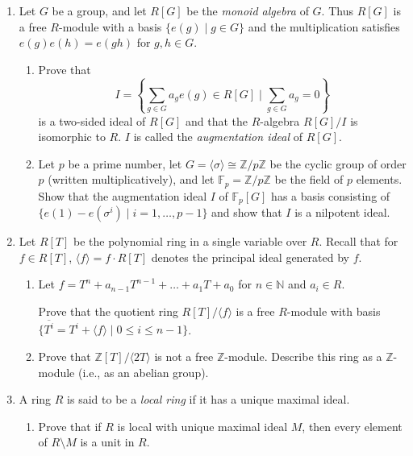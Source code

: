 \documentclass{article}
\begin{document}
\begin{enumerate}
\item
Let $ G $ be a group, and let $ R[G] $ be the \emph{monoid algebra} of $ G $. Thus $ R[G] $ is a free $ R $-module with a basis $ \{e(g) \mid g \in G\} $ and the multiplication satisfies $ e(g) e(h) = e(gh) $ for $ g, h \in G $.

\begin{enumerate}
    \item Prove that 
    $$I = \left\{\sum_{g \in G} a_g e(g) \in R[G] \; \bigg| \; \sum_{g \in G} a_g = 0 \right\}$$
    is a two-sided ideal of $ R[G] $ and that the $ R $-algebra $ R[G] / I $ is isomorphic to $ R $. $ I $ is called the \emph{augmentation ideal} of $ R[G] $.

    \item Let $ p $ be a prime number, let $ G = \langle \sigma \rangle \cong \mathbb{Z}/p\mathbb{Z} $ be the cyclic group of order $ p $ (written multiplicatively), and let $ \mathbb{F}_p = \mathbb{Z}/p\mathbb{Z} $ be the field of $ p $ elements. Show that the augmentation ideal $ I $ of $ \mathbb{F}_p[G] $ has a basis consisting of $ \{ e(1) - e(\sigma^i) \mid i = 1, \ldots, p-1 \} $ and show that  $ I $ is a nilpotent ideal.
\end{enumerate}

\item
Let $ R[T] $ be the polynomial ring in a single variable over $ R $.
Recall that for $ f \in R[T] $, $ \langle f \rangle = f \cdot R[T] $ denotes the principal ideal generated by $ f $.

\begin{enumerate}
    \item Let $ f = T^n + a_{n-1} T^{n-1} + \ldots + a_1 T + a_0 $ for $ n \in \mathbb{N} $ and $ a_i \in R $.
    
    Prove that the quotient ring $ R[T] / \langle f \rangle $ is a free $ R $-module with basis $ \{ \overline{T^i} = T^i + \langle f \rangle \mid 0 \leq i \leq n-1 \} $.
    
    \item Prove that $ \mathbb{Z}[T] / \langle 2T \rangle $ is not a free $ \mathbb{Z} $-module. Describe this ring as a $ \mathbb{Z} $-module (i.e., as an abelian group).
\end{enumerate}

\item
A ring $ R $ is said to be a \emph{local ring} if it has a unique maximal ideal.

\begin{enumerate}
    \item Prove that if $ R $ is local with unique maximal ideal $ M $, then every element of $ R \setminus M $ is a unit in $ R $.
    

\end{enumerate}
\end{enumerate}
\end{document}
